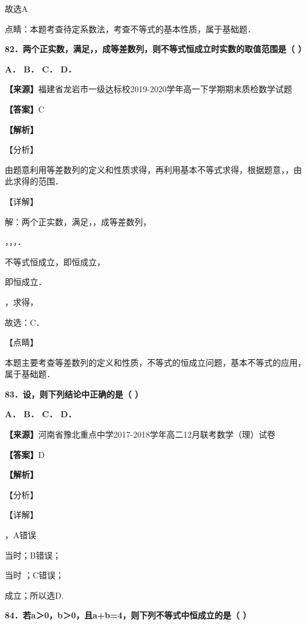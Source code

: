 \documentclass[
]{article}
\begin{document}
故选A

点睛：本题考查待定系数法，考查不等式的基本性质，属于基础题．

\textbf{82．两个正实数，满足，，成等差数列，则不等式恒成立时实数的取值范围是（
）}

\textbf{A． B． C． D．}

\textbf{【来源】}福建省龙岩市一级达标校2019-2020学年高一下学期期末质检数学试题

\textbf{【答案】}C

\textbf{【解析】}

【分析】

由题意利用等差数列的定义和性质求得，再利用基本不等式求得，根据题意，，由此求得的范围．

【详解】

解：两个正实数，满足，，成等差数列，

，，，．

不等式恒成立，即恒成立，

即恒成立．

，求得，

故选：C．

【点睛】

本题主要考查等差数列的定义和性质，不等式的恒成立问题，基本不等式的应用，属于基础题．

\textbf{83．设，则下列结论中正确的是（ ）}

\textbf{A． B． C． D．}

\textbf{【来源】}河南省豫北重点中学2017-2018学年高二12月联考数学（理）试卷

\textbf{【答案】}D

\textbf{【解析】}

【分析】

【详解】

，A错误

当时；B错误；

当时 ；C错误；

成立；所以选D.

\textbf{84．若a＞0，b＞0，且a+b=4，则下列不等式中恒成立的是（ ）}
\end{document}
